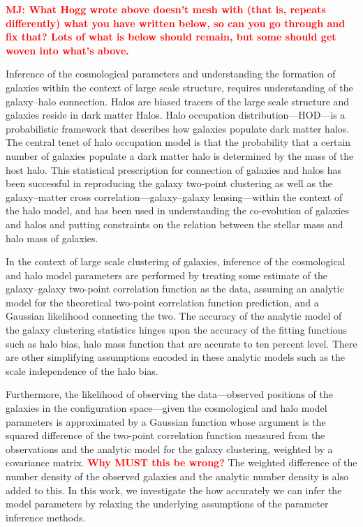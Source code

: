 \documentclass[12pt, preprint]{aastex}
\newcommand{\todo}[1]{{\bf \textcolor{red}{ #1}}}
\begin{document}
\todo{MJ: What Hogg wrote above doesn't mesh with (that is, repeats differently) what you have written below, so can you go through and fix that?  Lots of what is below should remain, but some should get woven into what's above.}


Inference of the cosmological parameters and understanding the formation of galaxies within the context of large scale 
structure, requires understanding of the galaxy--halo connection. Halos are biased tracers of the large scale structure 
and galaxies reside in dark matter Halos. Halo occupation distribution---HOD---is a probabilistic framework that describes how galaxies populate dark matter halos. The central tenet of halo occupation model is that the probability that a certain number of galaxies populate a dark matter halo is determined by the mass of the host halo. This statistical prescription for connection of galaxies and halos has been successful in reproducing the galaxy two-point clustering as well as the galaxy--matter cross correlation---galaxy--galaxy 
lensing---within the context of the halo model, and has been used in understanding the co-evolution of galaxies and halos and putting constraints on the relation between the stellar mass and halo mass of galaxies.

In the context of large scale clustering of galaxies, inference of the cosmological and halo model parameters are performed by treating some estimate of the galaxy--galaxy two-point correlation function as the data,
assuming an analytic model for the theoretical two-point correlation function prediction,
and a Gaussian likelihood connecting the two.
The accuracy of the analytic model of the galaxy clustering statistics hinges upon the accuracy of the fitting functions such as halo bias, halo mass function that are accurate to ten percent level. There are other simplifying assumptions encoded in these analytic models such as the scale independence of the halo bias. 

Furthermore, the likelihood of observing the data---observed positions of the galaxies in the configuration space---given the cosmological and halo model parameters is approximated by a Gaussian function whose argument is the squared difference of the two-point correlation function measured from the observations and the analytic model for the galaxy clustering, weighted by a covariance matrix.
\todo{Why MUST this be wrong?}
The weighted difference of the number density of the observed galaxies and the analytic number density is also added to this. In this work, we investigate the how accurately we can infer the model parameters by relaxing the underlying assumptions of the parameter inference methods. 
\end{document}
